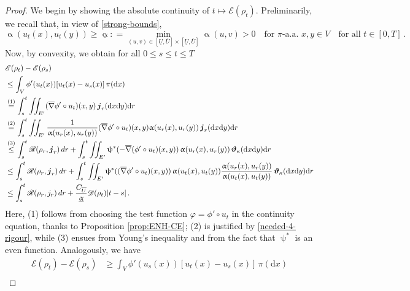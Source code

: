 \documentclass[11pt,reqno]{amsart}
\numberwithin{equation}{section}
\newcommand{\dnabla}{\overline\nabla}
\newcommand{\dd}{\mathrm{d}}
\theoremstyle{definition}
\def\dd{\mathrm{d}}
\newcommand{\Fish}{\mathscr{D}}
\newcommand{\teta}{\boldsymbol \vartheta}
\newcommand{\tetapi}{\boldsymbol{\teta}_{\kappa}}
\def\calS{\mathscr E}
\newcommand{\scrR}{\mathscr{R}}
\newcommand{\jj}{{\boldsymbol{j}}}
\newcommand{\RBS}{\color{black}} %
\newcommand{\EEE}{\color{black}}
\numberwithin{equation}{section}
\begin{document}
\begin{proof}
    We begin by showing the absolute continuity of $t\mapsto \calS(\rho_t)$. 
    \RBS Preliminarily, we recall that,  in view of \eqref{strong-bounds},
    \begin{equation}
    \label{needed-4-rigour}
     \upalpha(u_t(x),u_t(y)) \geq \underline{\upalpha}: = \min_{(u,v)\in [\underline U, \overline U]{\times} [\underline U, \overline U]} \upalpha(u,v)>0
     \quad \text{for } \pi\text{-a.a. } x,y \in V \quad \text{for all } t \in [0,T]\,.
         \end{equation}
  \EEE  Now, 
    by convexity, we obtain for all $0\leq s \leq t \leq T$
    \begin{align*}
       &  \calS(\rho_t) - \calS(\rho_s)
       \\
        &\le \int_V \phi'(u_t(x)) [u_t(x)-u_s(x)]\,\pi(\dd x) \\
        &\stackrel{(1)}{=} \int_s^t \iint_{\RBS E'} (\dnabla \phi'\circ u_t)(x,y)\,\jj_r(\dd x \dd y) \dd r \\
        &\stackrel{(2)}{=} \int_s^t \iint_{\RBS E'}  \RBS  \frac1{\upalpha(u_r(x),u_r(y))} \EEE (\dnabla \phi'\circ u_t)(x,y) 
        \RBS \upalpha(u_r(x),u_r(y)) \EEE
        \,\jj_r(\dd x \dd y) \dd r \\ 
        &\stackrel{(3)}\le \int_s^t \scrR(\rho_r,\jj_r)\,dr + \int_s^t \iint_{\RBS E'}  \uppsi^*({-}\dnabla (\phi'\circ u_t)(x,y))\,\upalpha(u_r(x),u_r(y))\,\tetapi(\dd x \dd y) \dd r \\
        &\le \int_s^t \scrR(\rho_r,\jj_r)\,dr + \int_s^t \iint_{\RBS E'}  \uppsi^*((\dnabla \phi'\circ u_t)(x,y))\, \upalpha(u_t(x),u_t(y)) \frac{\upalpha(u_r(x),u_r(y))}{\upalpha(u_t(x),u_t(y))}
        \,\tetapi(\dd x \dd y) \dd r  \\
        &\le \int_s^t \scrR(\rho_r,j_r)\,dr + \RBS \frac{C_{\overline{U}}}{ \underline{\upalpha}} \EEE  \Fish(\rho_t)|t-s|\,.
    \end{align*}
    \RBS Here,
    {\footnotesize (1)} follows from choosing the test function $\varphi =  \phi'\circ u_t $ in the continuity equation, thanks to Proposition \ref{prop:ENH-CE}; 
    {\footnotesize (2)}     is justified by \eqref{needed-4-rigour}, while     {\footnotesize (3)}  ensues from Young's inequality and from the fact that $\uppsi^*$ is an even function.
Analogously, we have 
    \begin{align*}
         \calS(\rho_t) - \calS(\rho_s)
        &\geq \int_V \phi'(u_s(x)) [u_t(x)-u_s(x)]\,\pi(\dd x) 
        \\

\end{align*}
\end{proof}
\end{document}
